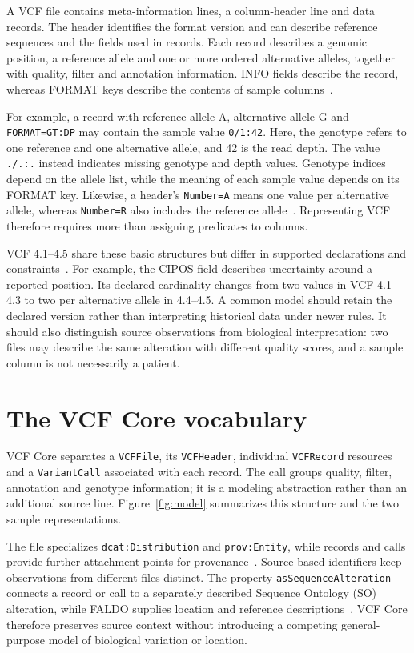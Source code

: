 \documentclass{ceurart}
\newcommand{\term}[1]{\texttt{#1}}
\begin{document}
A VCF file contains meta-information lines, a column-header line and data records.
The header identifies the format version and can describe reference sequences and the fields used in records.
Each record describes a genomic position, a reference allele and one or more ordered alternative alleles, together with quality, filter and annotation information.
INFO fields describe the record, whereas FORMAT keys describe the contents of sample columns~\cite{vcf45}.

For example, a record with reference allele A, alternative allele G and \term{FORMAT=GT:DP} may contain the sample value \term{0/1:42}.
Here, the genotype refers to one reference and one alternative allele, and 42 is the read depth.
The value \term{./.:.} instead indicates missing genotype and depth values.
Genotype indices depend on the allele list, while the meaning of each sample value depends on its FORMAT key.
Likewise, a header's \term{Number=A} means one value per alternative allele, whereas \term{Number=R} also includes the reference allele~\cite{vcf45}.
Representing VCF therefore requires more than assigning predicates to columns.

VCF 4.1--4.5 share these basic structures but differ in supported declarations and constraints~\cite{htsspecs,vcf45}.
For example, the CIPOS field describes uncertainty around a reported position.
Its declared cardinality changes from two values in VCF 4.1--4.3 to two per alternative allele in 4.4--4.5.
A common model should retain the declared version rather than interpreting historical data under newer rules.
It should also distinguish source observations from biological interpretation: two files may describe the same alteration with different quality scores, and a sample column is not necessarily a patient.

\section{The VCF Core vocabulary}
\label{sec:design}

VCF Core separates a \term{VCFFile}, its \term{VCFHeader}, individual \term{VCFRecord} resources and a \term{VariantCall} associated with each record.
The call groups quality, filter, annotation and genotype information; it is a modeling abstraction rather than an additional source line.
Figure~\ref{fig:model} summarizes this structure and the two sample representations.

The file specializes \term{dcat:Distribution} and \term{prov:Entity}, while records and calls provide further attachment points for provenance~\cite{prov2013,vcfc210}.
Source-based identifiers keep observations from different files distinct.
The property \term{asSequenceAlteration} connects a record or call to a separately described Sequence Ontology (SO) alteration, while FALDO supplies location and reference descriptions~\cite{eilbeck2005so,bolleman2016faldo}.
VCF Core therefore preserves source context without introducing a competing general-purpose model of biological variation or location.
\end{document}
